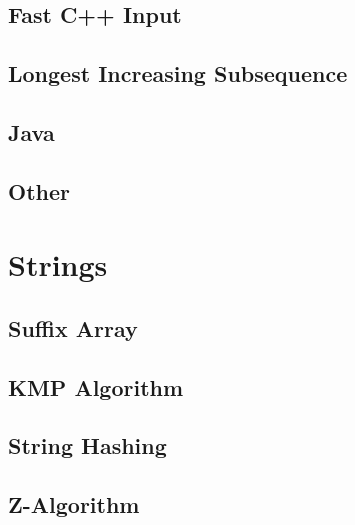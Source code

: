 \subsection{Fast C++ Input}
\raggedbottom
\hrulefill
\subsection{Longest Increasing Subsequence}
\raggedbottom
\hrulefill
\subsection{Java}
\raggedbottom
\hrulefill
\subsection{Other}
\raggedbottom
\hrulefill

\section{Strings}
\subsection{Suffix Array}
\raggedbottom
\hrulefill
\subsection{KMP Algorithm}
\raggedbottom
\hrulefill
\subsection{String Hashing}
\raggedbottom
\hrulefill
\subsection{Z-Algorithm}
\raggedbottom
\hrulefill

